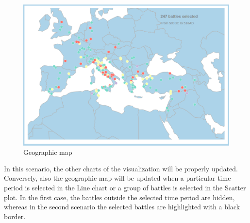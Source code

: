 \begin{figure}[h]
    \centering
    \includegraphics[scale=0.20]{./images/geographic_map.png}
    \caption{Geographic map}
\end{figure}

In this scenario, the other charts of the visualization will be properly updated. Conversely, also the geographic map will be updated when a particular time period is selected in the Line chart or a group of battles is selected in the Scatter plot. In the first case, the battles outside the selected time period are hidden, whereas in the second scenario the selected battles are highlighted with a black border.


